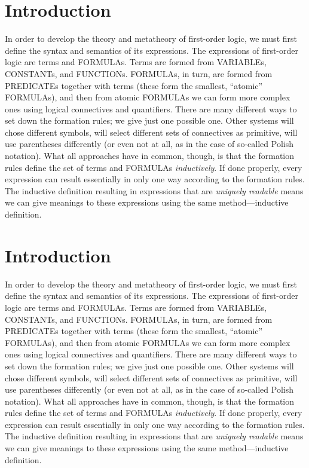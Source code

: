 \documentclass[10pt,a4paper]{article}
\newcommand*{\olup}[1]{\MakeUppercase{#1}}
\theoremstyle{plain}
\theoremstyle{definition}
\theoremstyle{remark}
\newcommand*{\olfileid}[3]{}
\newcommand*{\olsection}[1]{\section*{#1}}
\begin{document}
\olsection{Introduction}

In order to develop the theory and metatheory of first-order logic, we
must first define the syntax and semantics of its expressions.  The
expressions of first-order logic are terms and \olup{formula}s.  Terms
are formed from \olup{variable}s, \olup{constant}s, and \olup{function}s.
\olup{formula}s, in turn, are formed from \olup{predicate}s together with
terms (these form the smallest, ``atomic'' \olup{formula}s), and then
from atomic \olup{formula}s we can form more complex ones using logical
connectives and quantifiers.  There are many different ways to set
down the formation rules; we give just one possible one. Other systems
will chose different symbols, will select different sets of
connectives as primitive, will use parentheses differently (or even not
at all, as in the case of so-called Polish notation).  What all
approaches have in common, though, is that the formation rules define
the set of terms and \olup{formula}s \emph{inductively}. If done
properly, every expression can result essentially in only one way
according to the formation rules.  The inductive definition resulting
in expressions that are \emph{uniquely readable} means we can give
meanings to these expressions using the same method---inductive
definition.





\olfileid{fol}{syn}{int}

\olsection{Introduction}

In order to develop the theory and metatheory of first-order logic, we
must first define the syntax and semantics of its expressions.  The
expressions of first-order logic are terms and \olup{formula}s.  Terms
are formed from \olup{variable}s, \olup{constant}s, and \olup{function}s.
\olup{formula}s, in turn, are formed from \olup{predicate}s together with
terms (these form the smallest, ``atomic'' \olup{formula}s), and then
from atomic \olup{formula}s we can form more complex ones using logical
connectives and quantifiers.  There are many different ways to set
down the formation rules; we give just one possible one. Other systems
will chose different symbols, will select different sets of
connectives as primitive, will use parentheses differently (or even not
at all, as in the case of so-called Polish notation).  What all
approaches have in common, though, is that the formation rules define
the set of terms and \olup{formula}s \emph{inductively}. If done
properly, every expression can result essentially in only one way
according to the formation rules.  The inductive definition resulting
in expressions that are \emph{uniquely readable} means we can give
meanings to these expressions using the same method---inductive
definition.
\end{document}
